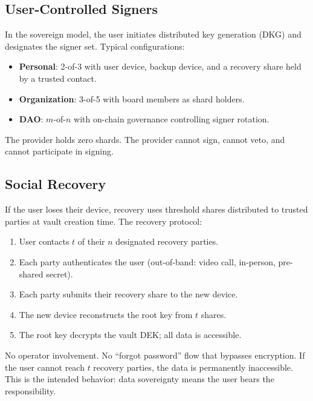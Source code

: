 \documentclass[11pt,a4paper]{article}
\begin{document}
\subsection{User-Controlled Signers}

In the sovereign model, the user initiates distributed key generation (DKG)
and designates the signer set.  Typical configurations:
\begin{itemize}[nosep]
  \item \textbf{Personal}: 2-of-3 with user device, backup device, and a
        recovery share held by a trusted contact.
  \item \textbf{Organization}: 3-of-5 with board members as shard holders.
  \item \textbf{DAO}: $m$-of-$n$ with on-chain governance controlling
        signer rotation.
\end{itemize}

The provider holds zero shards.  The provider cannot sign, cannot veto,
and cannot participate in signing.

\subsection{Social Recovery}

If the user loses their device, recovery uses threshold shares distributed
to trusted parties at vault creation time.  The recovery protocol:

\begin{enumerate}[nosep]
  \item User contacts $t$ of their $n$ designated recovery parties.
  \item Each party authenticates the user (out-of-band: video call, in-person,
        pre-shared secret).
  \item Each party submits their recovery share to the new device.
  \item The new device reconstructs the root key from $t$ shares.
  \item The root key decrypts the vault DEK; all data is accessible.
\end{enumerate}

No operator involvement.  No ``forgot password'' flow that bypasses
encryption.  If the user cannot reach $t$ recovery parties, the data is
permanently inaccessible.  This is the intended behavior: data sovereignty
means the user bears the responsibility.

\end{document}
